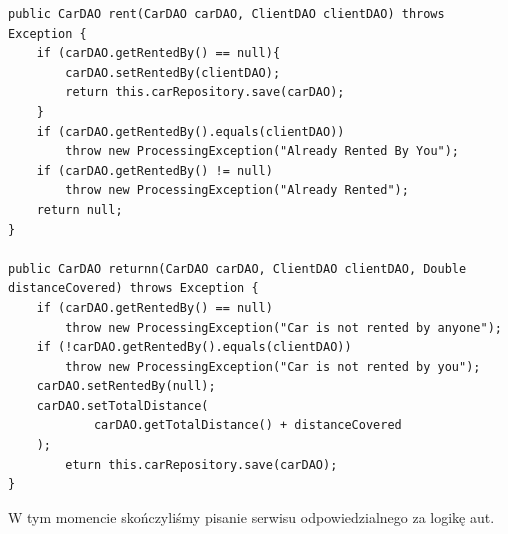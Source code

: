 \documentclass{article}
\begin{document}
        \begin{verbatim}
public CarDAO rent(CarDAO carDAO, ClientDAO clientDAO) throws Exception {
    if (carDAO.getRentedBy() == null){
        carDAO.setRentedBy(clientDAO);
        return this.carRepository.save(carDAO);
    }
    if (carDAO.getRentedBy().equals(clientDAO))
        throw new ProcessingException("Already Rented By You");
    if (carDAO.getRentedBy() != null)
        throw new ProcessingException("Already Rented");
    return null;
}

public CarDAO returnn(CarDAO carDAO, ClientDAO clientDAO, Double distanceCovered) throws Exception {
    if (carDAO.getRentedBy() == null)
        throw new ProcessingException("Car is not rented by anyone");
    if (!carDAO.getRentedBy().equals(clientDAO))
        throw new ProcessingException("Car is not rented by you");
    carDAO.setRentedBy(null);
    carDAO.setTotalDistance(
            carDAO.getTotalDistance() + distanceCovered
    );
        eturn this.carRepository.save(carDAO);
}
        \end{verbatim}
        W tym momencie skończyliśmy pisanie serwisu odpowiedzialnego za logikę aut.
\end{document}
